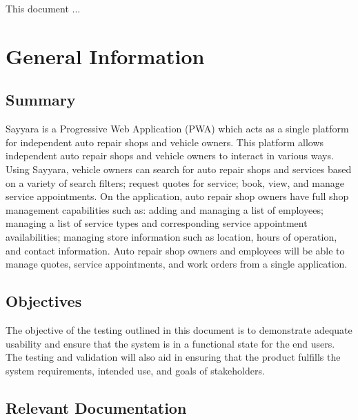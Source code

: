 \documentclass[12pt, titlepage]{article}
\begin{document}

This document ... 

\section{General Information}

\subsection{Summary}

Sayyara is a Progressive Web Application (PWA) which acts as a single platform for independent auto
repair shops and vehicle owners. This platform allows independent auto repair shops and vehicle
owners to interact in various ways. Using Sayyara, vehicle owners can search for auto repair shops
and services based on a variety of search filters; request quotes for service; book, view, and
manage service appointments. On the application, auto repair shop owners have full shop management
capabilities such as: adding and managing a list of employees; managing a list of service types and
corresponding service appointment availabilities; managing store information such as location,
hours of operation, and contact information. Auto repair shop owners and employees will be able to
manage quotes, service appointments, and work orders from a single application.

\subsection{Objectives}

The objective of the testing outlined in this document is to demonstrate adequate usability and
ensure that the system is in a functional state for the end users. The testing and validation will
also aid in ensuring that the product fulfills the system requirements, intended use, and goals of
stakeholders.

\subsection{Relevant Documentation}

\end{document}
